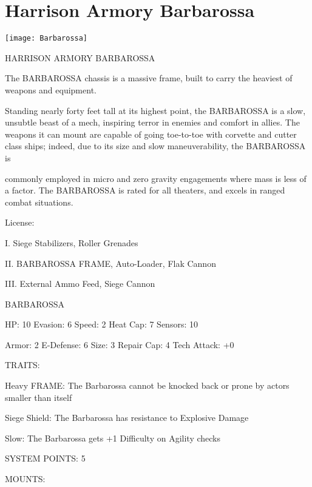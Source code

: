 \section{Harrison Armory Barbarossa}


\texttt{[image: Barbarossa]}

                           HARRISON ARMORY BARBAROSSA

The BARBAROSSA chassis is a massive frame, built to carry the heaviest of weapons and equipment.

Standing nearly forty feet tall at its highest point, the BARBAROSSA is a slow, unsubtle beast of a mech,
inspiring terror in enemies and comfort in allies. The weapons it can mount are capable of going toe-to-toe
with corvette and cutter class ships; indeed, due to its size and slow maneuverability, the BARBAROSSA is




commonly employed in micro and zero gravity engagements where mass is less of a factor. The
BARBAROSSA is rated for all theaters, and excels in ranged combat situations.

                                                  License:

I. Siege Stabilizers, Roller Grenades

II. BARBAROSSA FRAME, Auto-Loader, Flak Cannon

III. External Ammo Feed, Siege Cannon


                                            BARBAROSSA

 HP: 10         Evasion: 6                           Speed: 2           Heat Cap: 7       Sensors: 10

 Armor:  2      E-Defense: 6                         Size: 3            Repair Cap: 4     Tech Attack:
                                                                                          +0

                                                  TRAITS:

 Heavy FRAME: The Barbarossa cannot be knocked back or prone by actors smaller than itself

 Siege Shield: The Barbarossa has resistance to Explosive Damage

 Slow: The Barbarossa gets +1 Difficulty on Agility checks

                                           SYSTEM POINTS: 5

                                                 MOUNTS:

